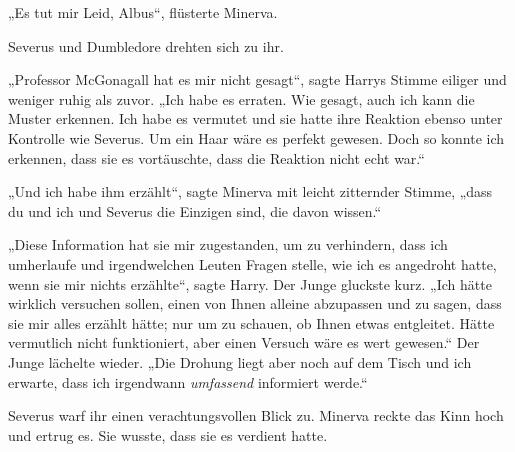„Es tut mir Leid, Albus“, flüsterte Minerva. 

Severus und Dumbledore drehten sich zu ihr. 

„Professor McGonagall hat es mir nicht gesagt“, sagte Harrys Stimme eiliger und weniger ruhig als zuvor. „Ich habe es erraten. Wie gesagt, auch ich kann die Muster erkennen. Ich habe es vermutet und sie hatte ihre Reaktion ebenso unter Kontrolle wie Severus. Um ein Haar wäre es perfekt gewesen. Doch so konnte ich erkennen, dass sie es vortäuschte, dass die Reaktion nicht echt war.“ 

„Und ich habe ihm erzählt“, sagte Minerva mit leicht zitternder Stimme, „dass du und ich und Severus die Einzigen sind, die davon wissen.“ 

„Diese Information hat sie mir zugestanden, um zu verhindern, dass ich umherlaufe und irgendwelchen Leuten Fragen stelle, wie ich es angedroht hatte, wenn sie mir nichts erzählte“, sagte Harry. Der Junge gluckste kurz. „Ich hätte wirklich versuchen sollen, einen von Ihnen alleine abzupassen und zu sagen, dass sie mir alles erzählt hätte; nur um zu schauen, ob Ihnen etwas entgleitet. Hätte vermutlich nicht funktioniert, aber einen Versuch wäre es wert gewesen.“ Der Junge lächelte wieder. „Die Drohung liegt aber noch auf dem Tisch und ich erwarte, dass ich irgendwann \emph{umfassend} informiert werde.“ 

Severus warf ihr einen verachtungsvollen Blick zu. Minerva reckte das Kinn hoch und ertrug es. Sie wusste, dass sie es verdient hatte. 

